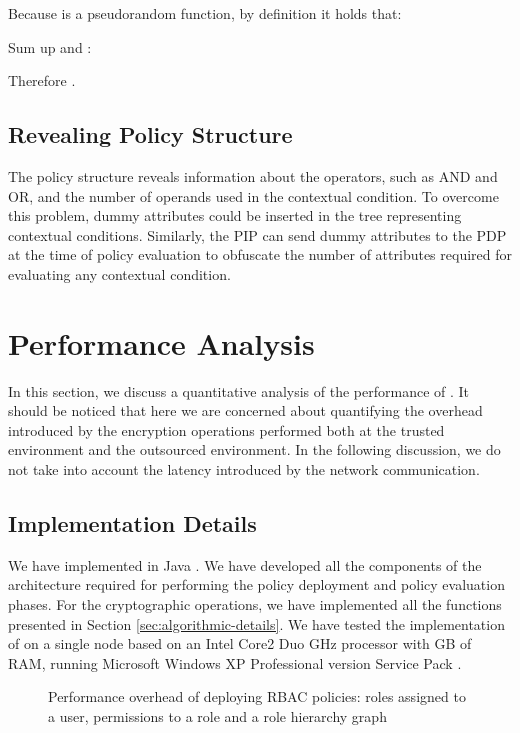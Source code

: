 \documentclass[final,5p,times,twocolumn]{elsarticle}
\begin{document}
Because  is a pseudorandom function, by definition it holds that:


Sum up  and :



Therefore . 



\subsection{Revealing Policy Structure}
The policy structure reveals information about the operators, such as AND and OR, and the number of operands used in the contextual condition. To overcome this problem, dummy attributes could be inserted in the tree representing contextual conditions. Similarly, the PIP can send dummy attributes to the PDP at the time of policy evaluation to obfuscate the number of attributes required for evaluating any contextual condition.

\section{Performance Analysis}
\label{sec:performance-analysis}

In this section, we discuss a quantitative analysis of the performance of . It should be noticed that here we are concerned about quantifying the overhead introduced by the encryption operations performed both at the trusted environment and the outsourced environment. In the following discussion, we do not take into account the latency introduced by the network communication.


\subsection{Implementation Details}

We have implemented  in Java . We have developed all the components of the architecture required for performing the policy deployment and policy evaluation phases. For the cryptographic operations, we have implemented all the functions presented in Section \ref{sec:algorithmic-details}. We have tested the implementation of  on a single node based on an Intel Core2 Duo  GHz processor with  GB of RAM, running Microsoft Windows XP Professional version  Service Pack . 

\begin{figure*}
\centering
{}
\caption{Performance overhead of deploying RBAC policies:  roles assigned to a user,  permissions to a role and  a role hierarchy graph}
\label{fig:policy-deployment-rbac-policy}
\end{figure*}
\end{document}
